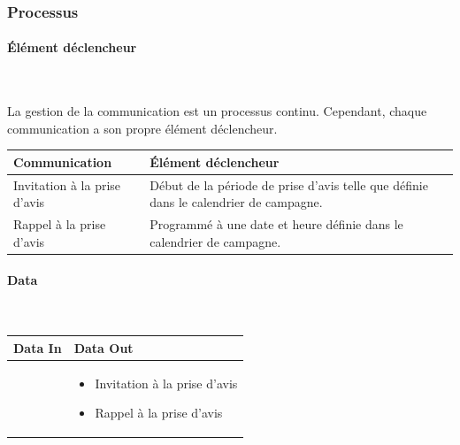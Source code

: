 \documentclass[a4paper,11pt]{report}
\begin{document}
\subsubsection{Processus}
\paragraph{Élément déclencheur}~\newline{}

La gestion de la communication est un processus continu.
Cependant, chaque communication a son propre élément déclencheur.\newline{}

\begin{tabularx}{\linewidth}{|l|X|} \hline
Communication & Élément déclencheur \\ \hline
Invitation à la prise d'avis & Début de la période de prise d'avis telle que définie dans le calendrier de campagne. \\
Rappel à la prise d'avis & Programmé à une date et heure définie dans le calendrier de campagne. \\ \hline
\end{tabularx}



\paragraph{Data}~\newline{}

\begin{tabularx}{\linewidth}{|X|X|} \hline
Data In & Data Out \\ \hline
 & 
\begin{itemize}
	\item Invitation à la prise d'avis
	\item Rappel à la prise d'avis\newline{}
\end{itemize}
\\ \hline
\end{tabularx}
\end{document}
